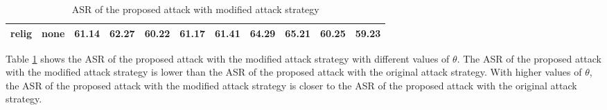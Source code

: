 \documentclass{article}
\begin{document}
\begin{table}
\begin{tabular}{p{1cm}p{1cm}p{1cm}p{1cm}p{1cm}p{1cm}p{1cm}p{1cm}p{1cm}p{1cm}p{1cm}}
         relig           & none             &          61.14 &                       62.27 &                       60.22 &                       61.17 &                       61.41 &                       64.29 &                        \textbf{65.21} &                        60.25 & 59.23 \\
        \hline
    \end{tabular}
    \caption{ASR of the proposed attack with modified attack strategy}
    \label{tab:asr_improved_attack}
    \end{table}


Table \ref{tab:asr_improved_attack} shows the ASR of the proposed attack with the modified attack strategy with different values of $\theta$.
The ASR of the proposed attack with the modified attack strategy is lower than the ASR of the proposed attack with the original attack strategy.
With higher values of $\theta$, the ASR of the proposed attack with the modified attack strategy is closer to the ASR of the proposed attack with the original attack strategy.
\end{document}
